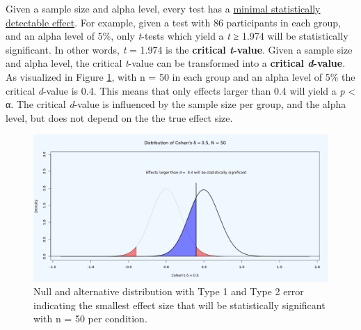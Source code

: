 \documentclass[
  oneside]{book}
\begin{document}
Given a sample size and alpha level, every test has a \protect\hyperlink{minimaldetectable}{minimal statistically detectable effect}. For example, given a test with 86 participants in each group, and an alpha level of 5\%, only \emph{t}-tests which yield a \emph{t} ≥ 1.974 will be statistically significant. In other words, \emph{t} = 1.974 is the \textbf{critical \emph{t}-value}. Given a sample size and alpha level, the critical \emph{t}-value can be transformed into a \textbf{critical \emph{d}-value}. As visualized in Figure \ref{fig:distpowerplot1}, with n = 50 in each group and an alpha level of 5\% the critical \emph{d}-value is 0.4. This means that only effects larger than 0.4 will yield a \emph{p} \textless{} α. The critical \emph{d}-value is influenced by the sample size per group, and the alpha level, but does not depend on the the true effect size.



\begin{figure}

{\centering \includegraphics[width=1\linewidth]{images/dpplot50} 

}

\caption{Null and alternative distribution with Type 1 and Type 2 error indicating the smallest effect size that will be statistically significant with n = 50 per condition.}\label{fig:distpowerplot1}
\end{figure}
\end{document}
